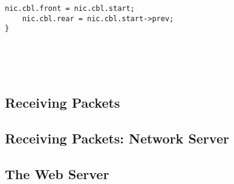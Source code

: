 \documentclass{article}
\begin{document}
\begin{CJK*}{UTF8}{gkai}
\begin{lstlisting}[style=ccode, title={\scriptsize \ttfamily \bfseries kern/e100.c: cbl\_alloc()}]
    nic.cbl.front = nic.cbl.start;
    nic.cbl.rear = nic.cbl.start->prev;
}
\end{lstlisting}



\begin{lstlisting}[style=ccode, title={\scriptsize \ttfamily \bfseries kern/pci.c}]
\end{lstlisting}

\begin{lstlisting}[style=ccode, title={\scriptsize \ttfamily \bfseries kern/pci.c}]
\end{lstlisting}


\begin{lstlisting}[style=exercise]
\end{lstlisting}

\begin{lstlisting}[style=console]
\end{lstlisting}


\begin{lstlisting}[style=console]
\end{lstlisting}




\subsection{Receiving Packets}

\subsection{Receiving Packets: Network Server}

\subsection{The Web Server}

\begin{lstlisting}[style=ccode, title={\scriptsize \ttfamily \bfseries kern/pci.c}]
\end{lstlisting}

\begin{lstlisting}[style=exercise]
\end{lstlisting}

\clearpage

\end{CJK*}
\end{document}
